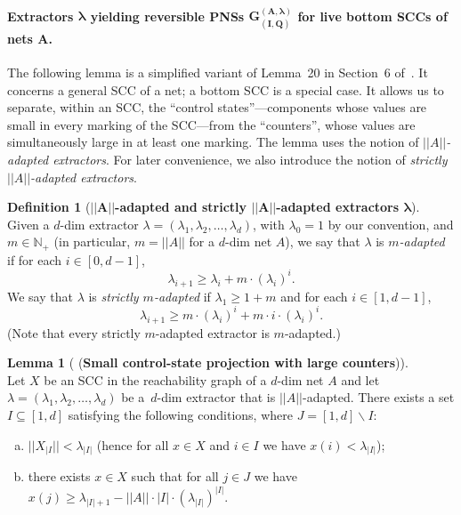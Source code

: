 \documentclass[11pt,a4paper]{amsart}
\newcommand{\nnorm}[1]{||#1||}
\newcommand{\rst}[2]{#1{_{| #2}}}
\newcommand{\sizeof}[1]{|#1|}
\newcommand{\Nat}{\mathbb{N}}
\newcommand{\setN}{\Nat}
\theoremstyle{plain}
\theoremstyle{definition}
\newtheorem{defi}[thm]{Definition}
\theoremstyle{defC}
\theoremstyle{thmC}
\newtheorem{lemC}[thm]{Lemma}
\begin{document}
\paragraph{Extractors $\bm{\lambda}$ yielding reversible PNSs
$\bm{G^{(A,\lambda)}_{(I,Q)}}$ for
live bottom SCCs of nets $\bm{A}$.}

The following lemma is a simplified variant of Lemma~20 in
Section~6 of~\cite{DBLP:conf/fsttcs/Leroux19}. It concerns a general
SCC of a net; a bottom SCC 
is a special case. It allows us to separate, within an SCC, the
``control states''---components whose values are small in every marking
of the SCC---from the ``counters'', whose values are simultaneously
large in at least one marking.
The lemma uses the notion of \emph{$\nnorm{A}$-adapted
extractors}. For later convenience, we also introduce the notion of
\emph{strictly $\nnorm{A}$-adapted
extractors}.

\begin{defi}[\textbf{$\bm{\nnorm{A}}$-adapted and strictly $\bm{\nnorm{A}}$-adapted extractors
	$\bm{\lambda}$}]\label{def:Aadaptextract}
\hfill\\
	Given a $d$-dim extractor
	$\lambda=(\lambda_1,\lambda_2,\dots,\lambda_d)$, with
	$\lambda_0=1$ by our convention,
	and
	$m\in\setN_+$ (in particular, $m=\nnorm{A}$ for a $d$-dim net
	$A$), we say that $\lambda$ is \emph{$m$-adapted}
if  for each
	$i\in[0,d{-}1]$,
	\[\lambda_{i+1}\geq \lambda_i+m\cdot (\lambda_i)^i.\]
	 We say that $\lambda$ is  \emph{strictly
	$m$-adapted} if $\lambda_1\geq 1+m$ and
	for each
	$i\in[1,d{-}1]$,
	\begin{equation}\label{eq:genextr}
		\lambda_{i+1}\geq m\cdot (\lambda_i)^i+m\cdot
	i\cdot(\lambda_i)^i.
	\end{equation}
	(Note that every strictly $m$-adapted extractor is $m$-adapted.)
\end{defi}


\begin{lemC}[\cite{DBLP:conf/fsttcs/Leroux19} (\textbf{Small control-state projection with large
	counters})]\label{lem:sccfirst}
\hfill\\
	Let $X$ be an SCC in the reachability graph of a $d$-dim net $A$ 
 and
	let
	$\lambda=(\lambda_1,\lambda_2,\dots,\lambda_d)$ be a~$d$-dim
	extractor that is $\nnorm{A}$-adapted. 
	There exists a 
	set $I\subseteq[1,d]$
	satisfying the following conditions, where
	$J=[1,d]\smallsetminus I$:
	\begin{enumerate}[a)]	
\item
	$\nnorm{\rst{X}{I}}<\lambda_{|I|}$ (hence for all $x\in X$ and
			$i\in I$ we have $x(i)<\lambda_{|I|}$);			
\item
there exists			$x\in X$
such that for all $j\in J$ we have
		$x(j)\geq
		\lambda_{\sizeof{I}+1}-\nnorm{A}\cdot\sizeof{I}\cdot(\lambda_{\sizeof{I}})^{\sizeof{I}}$.
	\end{enumerate}
\end{lemC}
\end{document}
